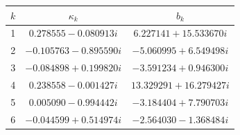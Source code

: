 \begin{center}
\begin{tabular}{ccc}
\hline
$k$ & $\kappa_k$ & $b_k$\\
\hline
1 & $0.278555-0.080913i$ & $6.227141+15.533670i$\\
2 & $-0.105763-0.895590i$ & $-5.060995+6.549498i$\\
3 & $-0.084898+0.199820i$ & $-3.591234+0.946300i$\\
4 & $0.238558-0.001427i$ & $13.329291+16.279427i$\\
5 & $0.005090-0.994442i$ & $-3.184404+7.790703i$\\
6 & $-0.044599+0.514974i$ & $-2.564030-1.368484i$\\
\hline
\end{tabular}
\end{center}
